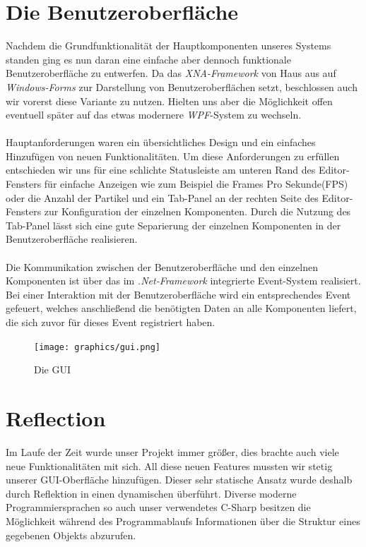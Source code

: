 \section{Die Benutzeroberfläche}
\begin{Spacing}{\mylinespace}

Nachdem die Grundfunktionalität der Hauptkomponenten unseres Systems standen ging es nun daran eine einfache aber dennoch funktionale Benutzeroberfläche zu entwerfen. Da das \textit{XNA-Framework} von Haus aus auf \textit{Windows-Forms} zur Darstellung von Benutzeroberflächen setzt, beschlossen auch wir vorerst diese Variante zu nutzen. Hielten uns aber die Möglichkeit offen eventuell später auf das etwas modernere \textit{WPF}-System zu wechseln.
\\\\
Hauptanforderungen waren ein übersichtliches Design und ein einfaches Hinzufügen von neuen Funktionalitäten. Um diese Anforderungen zu erfüllen entschieden wir uns für eine schlichte Statusleiste am unteren Rand des Editor-Fensters für einfache Anzeigen wie zum Beispiel die Frames Pro Sekunde(FPS) oder die Anzahl der Partikel und ein Tab-Panel an der rechten Seite des Editor-Fensters zur Konfiguration der einzelnen Komponenten. Durch die Nutzung des Tab-Panel lässt sich eine gute Separierung der einzelnen Komponenten in der Benutzeroberfläche realisieren. 
\\\\
Die Kommunikation zwischen der Benutzeroberfläche und den einzelnen Komponenten ist über das im \textit{.Net-Framework} integrierte Event-System realisiert. Bei einer Interaktion mit der Benutzeroberfläche wird ein entsprechendes Event gefeuert, welches anschließend die benötigten Daten an alle Komponenten liefert, die sich zuvor für dieses Event registriert haben.  

\begin{figure}[h!]
	\vspace*{30px}
	\texttt{[image: graphics/gui.png]}	
	\caption{Die GUI}
	\label{fig:GUI}
\end{figure}

\end{Spacing}
\newpage


\section{Reflection}
Im Laufe der Zeit wurde unser Projekt immer größer, dies brachte auch viele neue Funktionalitäten mit sich.
All diese neuen Features mussten wir stetig unserer GUI-Oberfläche hinzufügen. Dieser sehr statische Ansatz wurde deshalb durch Reflektion in einen dynamischen überführt.
Diverse moderne Programmiersprachen so auch unser verwendetes C-Sharp besitzen die Möglichkeit während des Programmablaufs Informationen über die Struktur eines gegebenen Objekts abzurufen.

